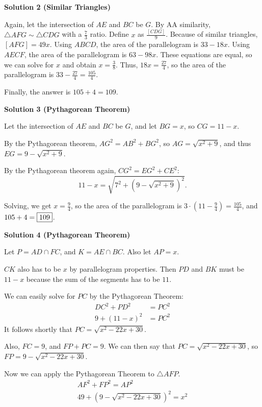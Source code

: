\begin{enumerate}
 



\textbf{Solution 2 (Similar Triangles)}

Again, let the intersection of $AE$ and $BC$ be $G$. By AA similarity, $\triangle AFG \sim \triangle CDG$ with a $\frac{7}{3}$ ratio. Define $x$ as $\frac{[CDG]}{9}$. Because of similar triangles, $[AFG] = 49x$. Using $ABCD$, the area of the parallelogram is $33-18x$. Using $AECF$, the area of the parallelogram is $63-98x$. These equations are equal, so we can solve for $x$ and obtain $x = \frac{3}{8}$. Thus, $18x = \frac{27}{4}$, so the area of the parallelogram is $33 - \frac{27}{4} = \frac{105}{4}$.

 Finally, the answer is $105+4=\boxed{109}$.

 



\textbf{Solution 3 (Pythagorean Theorem)}

Let the intersection of $AE$ and $BC$ be $G$, and let $BG=x$, so $CG=11-x$. 

 By the Pythagorean theorem, ${AG}^2={AB}^2+{BG}^2$, so $AG=\sqrt{x^2+9}$, and thus $EG=9-\sqrt{x^2+9}$. 

 By the Pythagorean theorem again, ${CG}^2={EG}^2+{CE}^2$: 
 \[11-x=\sqrt{7^2+(9-\sqrt{x^2+9})^2}.\]

 Solving, we get $x=\frac{9}{4}$, so the area of the parallelogram is $3\cdot\left(11-\frac{9}{4}\right)=\frac{105}{4}$, and $105+4=\framebox{109}$.

 



\textbf{Solution 4 (Pythagorean Theorem)}

Let $P = AD \cap FC$, and $K = AE \cap BC$. Also let $AP = x$.

 $CK$ also has to be $x$ by parallelogram properties. Then $PD$ and $BK$ must be $11-x$ because the sum of the segments has to be $11$.

 We can easily solve for $PC$ by the Pythagorean Theorem:
 \begin{align*} DC^2 + PD^2 &= PC^2\\ 9 + (11-x)^2 &= PC^2 \end{align*}
It follows shortly that $PC = \sqrt{x^2-22x+30}$.

 Also, $FC = 9$, and $FP + PC = 9$. We can then say that $PC = \sqrt{x^2-22x+30}$, so $FP = 9 - \sqrt{x^2-22x+30}$.

 Now we can apply the Pythagorean Theorem to $\triangle AFP$.
 \begin{align*} AF^2 + FP^2 = AP^2\\ 49 + \left(9 - \sqrt{x^2-22x+30}\right)^2 = x^2  \end{align*}



\end{enumerate}
